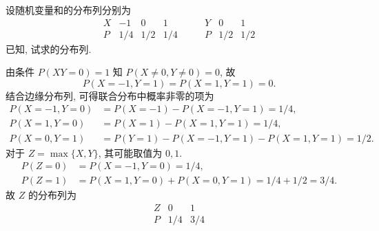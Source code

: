 \documentclass[../main.tex]{subfiles}
\begin{document}
\begin{exercise}{}{}
设随机变量和的分布列分别为
\[
\begin{array}{c|ccc}
X & -1 & 0 & 1\\ \hline
P & 1/4 & 1/2 & 1/4
\end{array}
\qquad
\begin{array}{c|cc}
Y & 0 & 1\\ \hline
P & 1/2 & 1/2
\end{array}
\]
已知, 试求的分布列.
\end{exercise}
\begin{solution}


由条件 \(P(XY=0)=1\) 知 \(P(X\neq 0, Y\neq 0)=0\), 故
\[
P(X=-1, Y=1) = P(X=1, Y=1) = 0.
\]
结合边缘分布列, 可得联合分布中概率非零的项为
\[
\begin{aligned}
P(X=-1, Y=0) &= P(X=-1) - P(X=-1, Y=1) = 1/4, \\
P(X=1, Y=0) &= P(X=1) - P(X=1, Y=1) = 1/4, \\
P(X=0, Y=1) &= P(Y=1) - P(X=-1, Y=1) - P(X=1, Y=1) = 1/2.
\end{aligned}
\]
对于 \(Z=\max\{X,Y\}\), 其可能取值为 \(0, 1\).
\[
\begin{aligned}
P(Z=0) &= P(X=-1, Y=0) = 1/4, \\
P(Z=1) &= P(X=1, Y=0) + P(X=0, Y=1) = 1/4 + 1/2 = 3/4.
\end{aligned}
\]
故 \(Z\) 的分布列为
\[
\begin{array}{c|cc}
Z & 0 & 1\\ \hline
P & 1/4 & 3/4
\end{array}
\]
\end{solution}
\end{document}
